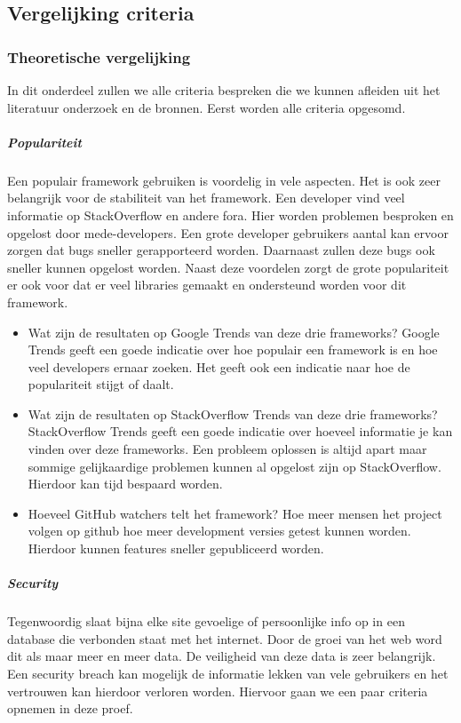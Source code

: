 \subsection{Vergelijking criteria}
\label{sec:Vergelijking_Criteria}

\subsubsection{Theoretische vergelijking}
\label{sec:Theoretische_Vergelijking}
In dit onderdeel zullen we alle criteria bespreken die we kunnen afleiden uit het literatuur onderzoek en de bronnen. Eerst worden alle criteria opgesomd.

\subparagraph{Populariteit}
Een populair framework gebruiken is voordelig in vele aspecten. Het is ook zeer belangrijk voor de stabiliteit van het framework. Een developer vind veel informatie op StackOverflow en andere fora. Hier worden problemen besproken en opgelost door mede-developers. Een grote developer gebruikers aantal kan ervoor zorgen dat bugs sneller gerapporteerd worden. Daarnaast zullen deze bugs ook sneller kunnen opgelost worden. Naast deze voordelen zorgt de grote populariteit er ook voor dat er veel libraries gemaakt en ondersteund worden voor dit framework.

\begin{itemize}
	\item Wat zijn de resultaten op Google Trends van deze drie frameworks? Google Trends geeft een goede indicatie over hoe populair een framework is en hoe veel developers ernaar zoeken. Het geeft ook een indicatie naar hoe de populariteit stijgt of daalt.
	\item Wat zijn de resultaten op StackOverflow Trends van deze drie frameworks? StackOverflow Trends geeft een goede indicatie over hoeveel informatie je kan vinden over deze frameworks. Een probleem oplossen is altijd apart maar sommige gelijkaardige problemen kunnen al opgelost zijn op StackOverflow. Hierdoor kan tijd bespaard worden.
	\item Hoeveel GitHub watchers telt het framework? Hoe meer mensen het project volgen op github hoe meer development versies getest kunnen worden. Hierdoor kunnen features sneller gepubliceerd worden.
\end{itemize}

\subparagraph{Security}
Tegenwoordig slaat bijna elke site gevoelige of persoonlijke info op in een database die verbonden staat met het internet. Door de groei van het web word dit als maar meer en meer data. De veiligheid van deze data is zeer belangrijk. Een security breach kan mogelijk de informatie lekken van vele gebruikers en het vertrouwen kan hierdoor verloren worden. Hiervoor gaan we een paar criteria opnemen in deze proef.

